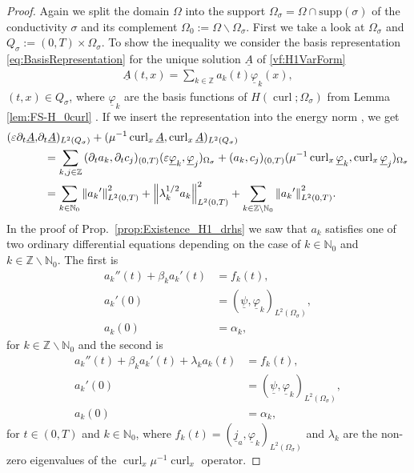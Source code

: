 \documentclass[a4paper,11pt]{article}
\newcommand{\N}{\mathbb N}
\newcommand{\Z}{\mathbb Z}
\newcommand{\omsig}{\Omega_{\sigma}}
\newcommand{\cu}{\operatorname{curl}}
\renewcommand{\vec}[1]{\underline{#1}}
\newcommand{\norm}[1]{{\left\lVert{#1}\right\rVert}}
\begin{document}
\begin{proof}
	Again we split the domain $\Omega$ into the support  $\omsig = \Omega \cap \mathrm{supp}(\sigma)$ of the conductivity $\sigma$ and its complement $\Omega_0:=\Omega\backslash\omsig$.
	First we take a look at $\omsig$ and $Q_\sigma := (0,T)\times\omsig$. To show the inequality we consider the basis representation \eqref{eq:BasisRepresentation} for the unique solution $\vec A$ of  \eqref{vf:H1VarForm}
	\begin{align*}
		\vec A(t,x)=\sum\limits_{k\in\Z} {a_k}(t)\vec \varphi_k(x),
	\end{align*}
	$(t,x) \in Q_\sigma$, where $\vec \varphi_k$ are the basis  functions of $H(\cu;\omsig)$ from Lemma \ref{lem:FS-H_0curl} .
	If we insert the representation into the energy norm , we get
	\begin{align}
		\nonumber
		(\varepsilon\partial_t \vec A,& \partial_t \vec A)_{L^2(Q_\sigma)}+(\mu^{-1}\cu_x \vec A,\cu_x \vec A)_{L^2(Q_\sigma)}\\
		\nonumber
		&\hspace*{.2cm}= \sum_{k,j\in\Z}  {( \partial_t {a_k},\partial_t c_j)_{(0,T)}(\varepsilon\vec \varphi_k,\vec \varphi_j)_{\omsig} + ({a_k}, c_j)_{(0,T)} (\mu^{-1}\cu_x\vec \varphi_k,\cu_x\vec \varphi_j)_{\omsig}}\\
		\label{eqn:energyNorm_linDep}
		&\hspace*{.2cm}=\sum_{k\in\N_0} {\norm{{a_k}'}_{L^2(0,T)}^2 +  \norm {\lambda_k^{1/2} {a_k}}_{L^2(0,T)}^2
			+\sum_{k\in \Z\backslash\N_0}\norm{{a_k}'}_{L^2(0,T)}^2}.
	\end{align}
	In the proof of Prop.~\ref{prop:Existence_H1_drhs} we saw that $ {a_k}$ satisfies one of two ordinary differential equations depending on the case of $k\in\N_0$ and $k\in\Z\backslash\N_0$. The first is
	\begin{align}
		\nonumber
		 {a_k}''(t)+ \beta_k  {a_k}'(t) &= f_k(t),\\
		\label{eqn:FirstDgl_LinDep}
		 {a_k}'(0) &= (\vec \psi,\vec \varphi_k)_{L^2(\omsig)},\\
		\nonumber
		 {a_k} (0) &=\alpha_k,
	\end{align}
	for  {$k\in \Z\backslash\N_0$} and the second is
	\begin{align}
		\nonumber
		 {a_k}''(t)+ \beta_k  {a_k}'(t)+ \lambda_k  {a_k}(t) &= f_k(t),\\
		\label{eqn:SecondDgl_LinDep}
		 {a_k}'(0) &= (\vec \psi,\vec \varphi_k)_{L^2(\omsig)},\\
		\nonumber
		 {a_k} (0) &=\alpha_k,
	\end{align}
	for $t\in (0,T)$ and $k\in \N_0$, where $f_k(t) =(\vec j_a,\vec \varphi_k)_{L^2(\omsig)} $ and $\lambda_k$ are the non-zero eigenvalues of the $\cu_x \mu^{-1} \cu_x$ operator.
	

\end{proof}
\end{document}

